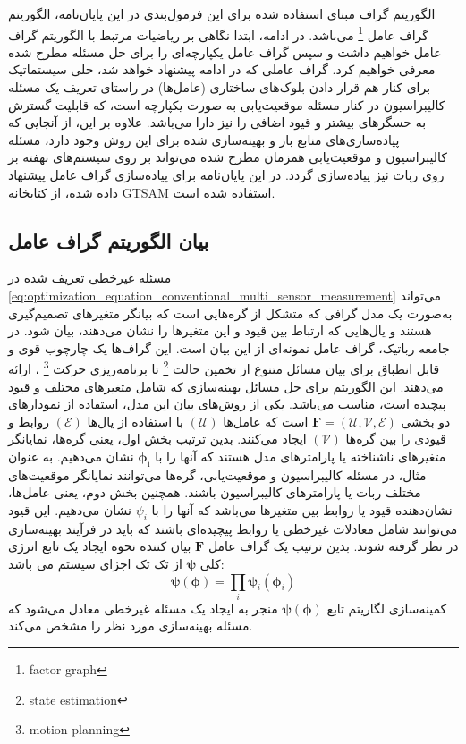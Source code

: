 الگوریتم گراف مبنای استفاده شده برای این فرمول‌بندی در این پایان‌نامه، الگوریتم گراف عامل
\footnote{factor graph}
می‌باشد. در ادامه، ابتدا نگاهی بر ریاضیات مرتبط با الگوریتم گراف عامل خواهیم داشت و سپس گراف عامل یکپارچه‌ای را برای حل مسئله مطرح شده معرفی خواهیم کرد. گراف عاملی که در ادامه پیشنهاد خواهد شد، حلی سیستماتیک برای کنار هم قرار دادن بلوک‌های ساختاری (عامل‌ها) در راستای تعریف یک مسئله کالیبراسیون در کنار مسئله موقعیت‌یابی به صورت یکپارچه است، که قابلیت گسترش به حسگرهای بیشتر و قیود اضافی را نیز دارا می‌باشد. علاوه بر این، از آنجایی که پیاده‌سازی‌های منابع باز و بهینه‌سازی شده برای این روش وجود دارد، مسئله کالیبراسیون و موقعیت‌یابی همزمان مطرح شده می‌تواند بر روی سیستم‌های نهفته بر روی ربات نیز پیاده‌سازی گردد. در این پایان‌نامه برای پیاده‌سازی گراف عامل پیشنهاد داده شده، از کتابخانه GTSAM استفاده شده است. 

\subsection{بیان الگوریتم گراف عامل}
مسئله غیرخطی تعریف شده در 
\ref{eq:optimization_equation_conventional_multi_sensor_measurement}
می‌تواند به‌صورت یک مدل گرافی که متشکل از گره‌هایی است که بیانگر متغیرهای تصمیم‌گیری هستند و یال‌هایی که ارتباط بین قیود و این متغیرها را نشان می‌دهند، بیان شود. در جامعه رباتیک، گراف عامل نمونه‌ای از این بیان است. این گراف‌ها یک چارچوب قوی و قابل انطباق برای بیان مسائل متنوع از تخمین حالت
\footnote{state estimation}
 تا برنامه‌ریزی حرکت
\footnote{motion planning}
 ، ارائه می‌دهند.  این الگوریتم برای حل مسائل بهینه‌سازی که شامل متغیرهای مختلف و قیود پیچیده است، مناسب می‌باشد. یکی از روش‌های بیان این مدل، استفاده از نمودارهای دو بخشی
$\boldsymbol{F} = (\mathcal{U}, \mathcal{V}, \mathcal{E})$
است که  عامل‌ها 
$(\mathcal{U})$
با استفاده از یال‌ها
$(\mathcal{E})$
روابط و قیودی را بین گره‌ها 
$(\mathcal{V})$
 ایجاد می‌کنند. بدین ترتیب بخش اول، یعنی گره‌ها، نمایانگر متغیرهای ناشناخته یا پارامترهای مدل هستند که آنها را با
$\boldsymbol{\phi_i}$
نشان می‌دهیم. به عنوان مثال، در مسئله کالیبراسیون و موقعیت‌یابی، گره‌ها می‌توانند نمایانگر موقعیت‌های مختلف ربات یا پارامترهای کالیبراسیون باشند. همچنین بخش دوم، یعنی عامل‌ها، نشان‌دهنده قیود یا روابط بین متغیرها می‌باشد که آنها را با
$\psi_i$
نشان می‌دهیم. این قیود می‌توانند شامل معادلات غیرخطی یا روابط پیچیده‌ای باشند که باید در فرآیند بهینه‌سازی در نظر گرفته شوند. بدین ترتیب یک گراف عامل 
$\boldsymbol{F}$
بیان کننده نحوه ایجاد یک تابع انرژی کلی
$\boldsymbol{\psi}$
از تک تک اجزای سیستم می باشد:
\begin{equation} 
	\boldsymbol{\psi}(\boldsymbol{\phi}) = \prod_{i} \boldsymbol{\psi}_i(\boldsymbol{\phi}_i) 
\end{equation}
کمینه‌سازی لگاریتم تابع 
$\boldsymbol{\psi}(\boldsymbol{\phi})$
منجر به ایجاد یک مسئله غیرخطی معادل می‌شود که مسئله بهینه‌سازی مورد نظر را مشخص می‌کند.



